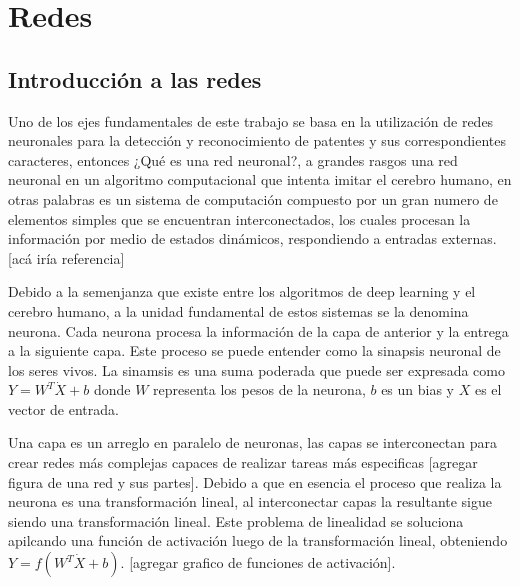 \section{Redes}

\subsection{Introducción a las redes}

Uno de los ejes fundamentales de este trabajo se basa en la utilización de redes neuronales para la detección y reconocimiento de patentes y sus correspondientes caracteres, entonces ¿Qué es una red neuronal?, a grandes rasgos una red neuronal en un algoritmo computacional que intenta imitar el cerebro humano, en otras palabras es un sistema de computación compuesto por un gran numero de elementos simples que se encuentran interconectados, los cuales procesan la información por medio de estados dinámicos, respondiendo a entradas externas.[acá iría referencia]

Debido a la semenjanza que existe entre los algoritmos de deep learning y el cerebro humano, a la unidad fundamental de estos sistemas se la denomina neurona.
Cada neurona procesa la información de la capa de anterior y la entrega a la siguiente capa. Este proceso se puede entender como la sinapsis neuronal de los seres vivos.
La sinamsis es una suma poderada que puede ser expresada como $Y = W^T\dot X + b$ donde $W$ representa los pesos de la neurona, $b$ es un bias y $X$ es el vector de entrada.

Una capa es un arreglo en paralelo de neuronas, las capas se interconectan para crear redes más complejas capaces de realizar tareas más especificas [agregar figura de una red y sus partes].
Debido a que en esencia el proceso que realiza la neurona es una transformación lineal, al interconectar capas la resultante sigue siendo una transformación lineal. Este problema de linealidad se soluciona apilcando una función de activación luego de la transformación lineal, obteniendo $Y=f(W^T \dot X + b)$. [agregar grafico de funciones de activación].

